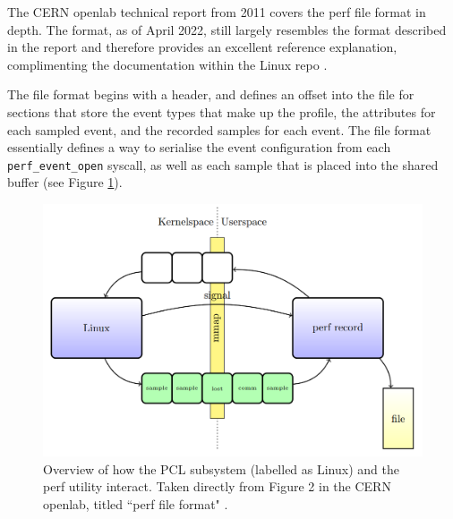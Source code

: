 The CERN openlab technical report from 2011 \cite{CERN_openlab_perf_file_format} covers the perf file format in depth. The format, as of April 2022, still largely resembles the format described in the report and therefore provides an excellent reference explanation, complimenting the documentation within the Linux repo \cite{GithubPerfFileFormat}.

The file format begins with a header, and defines an offset into the file for sections that store the event types that make up the profile, the attributes for each sampled event, and the recorded samples for each event. The file format essentially defines a way to serialise the event configuration from each \texttt{perf\_event\_open} syscall, as well as each sample that is placed into the shared buffer (see Figure \ref{fig:perf_design}). 

\begin{figure}[h!]
\centering
    \includegraphics[width=0.8\linewidth]{report-a_perf_design}
    \caption{Overview of how the PCL subsystem (labelled as Linux) and the perf utility interact. Taken directly from Figure 2 in the CERN openlab, titled ``perf file format" \cite{CERN_openlab_perf_file_format}.}
    \label{fig:perf_design}
\end{figure}


